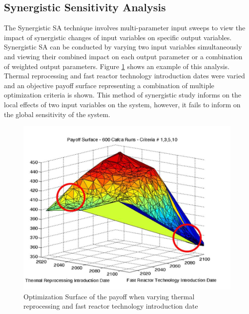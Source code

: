 \subsection{Synergistic Sensitivity Analysis}
The Synergistic \gls{SA} technique involves multi-parameter 
input sweeps to view the impact of synergistic 
changes of input variables on specific output variables. 
Synergistic \gls{SA} can be conducted by varying 
two input variables simultaneously and viewing their 
combined impact on each output parameter or a combination 
of weighted output parameters. 
Figure \ref{fig:passerini_payoff} shows an example of this analysis.
Thermal reprocessing and fast reactor technology introduction dates
were varied and an objective payoff surface representing a combination 
of multiple optimization criteria is shown. 
This method of synergistic study informs on the local effects of 
two input variables on the system, however, it fails to inform 
on the global sensitivity of the system. 

\begin{figure}[]
	\begin{center}
		\includegraphics[scale=0.25]{./figures/passerini_payoff.jpg}
	\end{center}	
		\caption{Optimization Surface of the payoff when varying thermal 
		reprocessing and fast reactor technology introduction date
		\cite{passerini_systematic_2014}}
	\label{fig:passerini_payoff}
\end{figure} 

